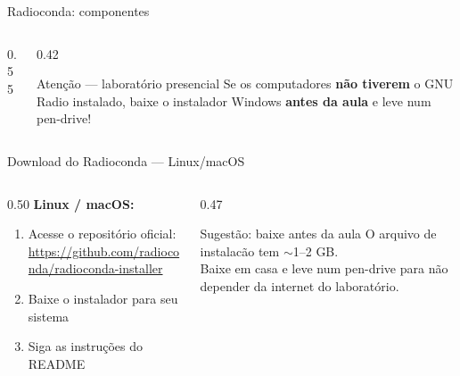 \documentclass[aspectratio=169]{beamer}
\begin{document}
\begin{frame}{Radioconda: componentes}
\begin{columns}
\begin{column}{0.55\textwidth}
\end{column}
\begin{column}{0.42\textwidth}
  \begin{alertblock}{Aten\c{c}\~{a}o --- laborat\'{o}rio presencial}
  Se os computadores \textbf{n\~{a}o tiverem} o GNU Radio instalado,
  baixe o instalador Windows \textbf{antes da aula} e leve num pen-drive!
  \end{alertblock}
\end{column}
\end{columns}
\end{frame}

\begin{frame}{Download do Radioconda --- Linux/macOS}
\begin{columns}
\begin{column}{0.50\textwidth}
  \textbf{Linux / macOS:}
  \begin{enumerate}
    \item Acesse o reposit\'{o}rio oficial:\\
      {\footnotesize\url{https://github.com/radioconda/radioconda-installer}}
    \item Baixe o instalador para seu sistema
    \item Siga as instru\c{c}\~{o}es do README
  \end{enumerate}
\end{column}
\begin{column}{0.47\textwidth}
  \begin{exampleblock}{Sugestão: baixe antes da aula}
  O arquivo de instalac\~{a}o tem $\sim$1--2 GB.\\
  Baixe em casa e leve num pen-drive para n\~{a}o depender
  da internet do laborat\'{o}rio.
  \end{exampleblock}
\end{column}
\end{columns}
\end{frame}
\end{document}
